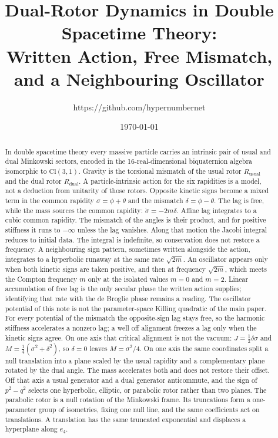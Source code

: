 \documentclass[a4paper]{article}
\title{Dual-Rotor Dynamics in Double Spacetime Theory:\\
Written Action, Free Mismatch, and a Neighbouring Oscillator}
\author{https://github.com/hypernumbernet}
\date{\today}
\begin{document}
\maketitle

\begin{abstract}
In double spacetime theory every massive particle carries an intrinsic pair of usual and dual Minkowski sectors, encoded in the 16-real-dimensional biquaternion algebra isomorphic to \(\mathrm{Cl}(3,1)\). Gravity is the torsional mismatch of the usual rotor \(R_{\mathrm{usual}}\) and the dual rotor \(R_{\mathrm{dual}}\). A particle-intrinsic action for the six rapidities is a model, not a deduction from unitarity of those rotors. Opposite kinetic signs become a mixed term in the common rapidity \(\sigma=\phi+\theta\) and the mismatch \(\delta=\phi-\theta\). The lag is free, while the mass sources the common rapidity: \(\ddot\sigma=-2m\delta\). Affine lag integrates to a cubic common rapidity. The mismatch of the angles is their product, and for positive stiffness it runs to \(-\infty\) unless the lag vanishes. Along that motion the Jacobi integral reduces to initial data. The integral is indefinite, so conservation does not restore a frequency. A neighbouring sign pattern, sometimes written alongside the action, integrates to a hyperbolic runaway at the same rate \(\sqrt{2m}\). An oscillator appears only when both kinetic signs are taken positive, and then at frequency \(\sqrt{2m}\), which meets the Compton frequency \(m\) only at the isolated values \(m=0\) and \(m=2\). Linear accumulation of free lag is the only secular phase the written action supplies; identifying that rate with the de Broglie phase remains a reading. The oscillator potential of this note is not the parameter-space Killing quadratic of the main paper. For every potential of the mismatch the opposite-sign lag stays free, so the harmonic stiffness accelerates a nonzero lag; a well off alignment freezes a lag only when the kinetic signs agree. On one axis that critical alignment is not the vacuum: \(J=\frac12\delta\sigma\) and \(M=\frac14(\sigma^2+\delta^2)\), so \(\delta=0\) leaves \(M=\sigma^2/4\). On one axis the same coordinates split a null translation into a plane scaled by the usual rapidity and a complementary plane rotated by the dual angle. The mass accelerates both and does not restore their offset. Off that axis a usual generator and a dual generator anticommute, and the sign of \(p^2-q^2\) selects one hyperbolic, elliptic, or parabolic rotor rather than two planes. The parabolic rotor is a null rotation of the Minkowski frame. Its truncations form a one-parameter group of isometries, fixing one null line, and the same coefficients act on translations. A translation has the same truncated exponential and displaces a hyperplane along \(e_4\).
\end{abstract}
\end{document}
